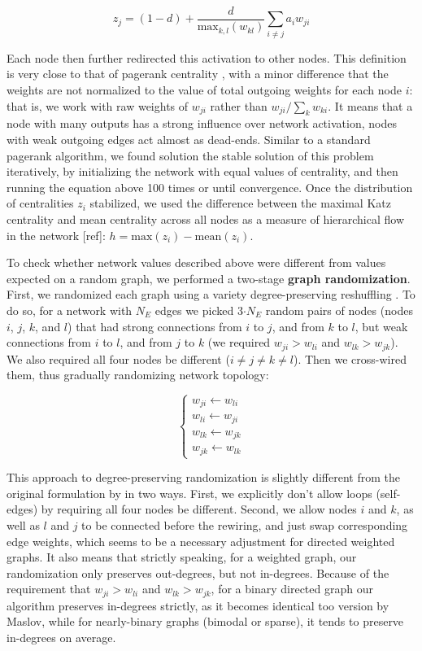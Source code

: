 \documentclass{article}
\begin{document}
\[ z_j = (1-d) + \frac{d}{\text{max}_{k,l}(w_{kl})} \sum_{i \neq j}{a_i w_{ji}} \]

Each node then further redirected this activation to other nodes. This definition is very close to that of pagerank centrality \citep{page1999pagerank}, with a minor difference that the weights are not normalized to the value of total outgoing weights for each node $i$: that is, we work with raw weights of $w_{ji}$ rather than $w_{ji}/\sum_k{w_{ki}}$. It means that a node with many outputs has a strong influence over network activation, nodes with weak outgoing edges act almost as dead-ends. Similar to a standard pagerank algorithm, we found solution the stable solution of this problem iteratively, by initializing the network with equal values of centrality, and then running the equation above 100 times or until convergence. Once the distribution of centralities $z_i$ stabilized, we used the difference between the maximal Katz centrality and mean centrality across all nodes as a measure of hierarchical flow in the network [ref]: $h = \text{max}(z_i) - \text{mean}(z_i)$.

To check whether network values described above were different from values expected on a random graph, we performed a two-stage \textbf{graph randomization}. First, we randomized each graph using a variety degree-preserving reshuffling \citep{maslov2002}. To do so, for a network with $N_E$ edges we picked 3$\cdot N_E$ random pairs of nodes (nodes $i$, $j$, $k$, and $l$) that had strong connections from $i$ to $j$, and from $k$ to $l$, but weak connections from $i$ to $l$, and from $j$ to $k$ (we required $w_{ji}>w_{li}$ and $w_{lk}>w_{jk}$). We also required all four nodes be different ($i \neq j \neq k \neq l$). Then we cross-wired them, thus gradually randomizing network topology:

\[ \left \{ \begin{array}{l}  
w_{ji} \leftarrow w_{li} \\ 
w_{li} \leftarrow w_{ji} \\
w_{lk} \leftarrow w_{jk} \\
w_{jk} \leftarrow w_{lk}
\end{array} \right. \]

This approach to degree-preserving randomization is slightly different from the original formulation by \citep{maslov2002} in two ways. First, we explicitly don’t allow loops (self-edges) by requiring all four nodes be different. Second, we allow nodes $i$ and $k$, as well as $l$ and $j$ to be connected before the rewiring, and just swap corresponding edge weights, which seems to be a necessary adjustment for directed weighted graphs. It also means that strictly speaking, for a weighted graph, our randomization only preserves out-degrees, but not in-degrees. Because of the requirement that $w_{ji}>w_{li}$ and $w_{lk}>w_{jk}$, for a binary directed graph our algorithm preserves in-degrees strictly, as it becomes identical too version by Maslov, while for nearly-binary graphs (bimodal or sparse), it tends to preserve in-degrees on average.
\end{document}
